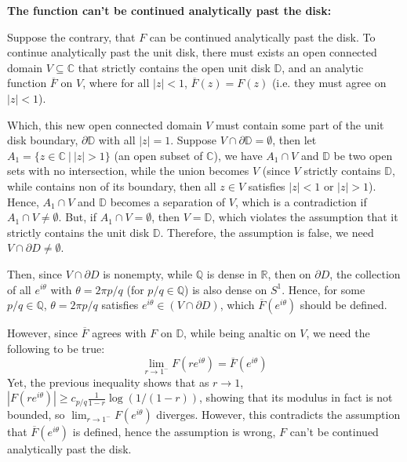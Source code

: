 \documentclass{article}
\begin{document}
\hfil

\textbf{The function can't be continued analytically past the disk:}

Suppose the contrary, that $F$ can be continued analytically past the disk. To continue analytically past the unit disk, there must exists an open connected domain $V\subseteq \mathbb{C}$ that strictly contains the open unit disk $\mathbb{D}$, and an analytic function $\overline{F}$ on $V$,
where for all $|z|<1$, $\overline{F}(z)=F(z)$ (i.e. they must agree on $|z|<1$).

Which, this new open connected domain $V$ must contain some part of the unit disk boundary, $\partial\mathbb{D}$ with all $|z|=1$.
Suppose $V\cap \partial\mathbb{D}=\emptyset$, then let $A_1=\{z\in\mathbb{C}\ |\ |z|>1\}$ (an open subset of $\mathbb{C}$), we have $A_1\cap V$ and $\mathbb{D}$ be two open sets with no intersection,
while the union becomes $V$ (since $V$ strictly contains $\mathbb{D}$, while contains non of its boundary, then all $z\in V$ satisfies $|z|<1$ or $|z|>1$). Hence, $A_1\cap V$ and $\mathbb{D}$ becomes a separation of $V$, which is a contradiction if $A_1\cap V\neq \emptyset$.
But, if $A_1\cap V=\emptyset$, then $V=\mathbb{D}$, which violates the assumption that it strictly contains the unit disk $\mathbb{D}$. Therefore, the assumption is false, we need $V\cap \partial D\neq \emptyset$.

Then, since $V\cap \partial D$ is nonempty, while $\mathbb{Q}$ is dense in $\mathbb{R}$, then on $\partial D$, the collection of all $e^{i\theta}$ with $\theta=2\pi p/q$ (for $p/q\in\mathbb{Q}$) is also dense on $S^1$. Hence, for some $p/q\in\mathbb{Q}$, $\theta = 2\pi p/q$ satisfies $e^{i\theta}\in (V\cap \partial D)$,
which $\overline{F}(e^{i\theta})$ should be defined.

However, since $\overline{F}$ agrees with $F$ on $\mathbb{D}$, while being analtic on $V$, we need the following to be true:
$$\lim_{r\rightarrow 1^-}F(re^{i\theta})=\overline{F}(e^{i\theta})$$
Yet, the previous inequality shows that as $r\rightarrow 1$, $|F(re^{i\theta})|\geq c_{p/q}\frac{1}{1-r}\log(1/(1-r))$, showing that its modulus in fact is not bounded, so $\lim_{r\rightarrow 1^-}F(e^{i\theta})$ diverges. However, this contradicts the assumption that $\overline{F}(e^{i\theta})$ is defined, hence the assumption is wrong, $F$ can't be continued analytically past the disk. 
\end{document}
